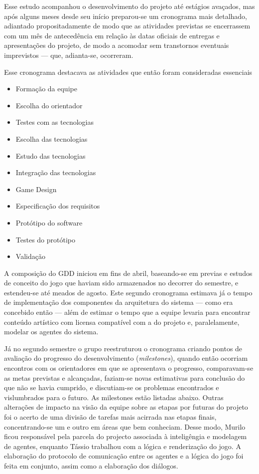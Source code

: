 Esse estudo acompanhou o desenvolvimento do projeto até estágios avaçados, mas após alguns meses desde seu início preparou-se um cronograma mais detalhado, adiantado propositadamente de modo que as atividades previstas se encerrassem com um mês de antecedência em relação às datas oficiais de entregas e apresentações do projeto, de modo a acomodar sem transtornos eventuais imprevistos --- que, adianta-se, ocorreram.

Esse cronograma destacava as atividades que então foram consideradas essenciais
\begin{itemize}
\item Formação da equipe
\item Escolha do orientador
\item Testes com as tecnologias
\item Escolha das tecnologias
\item Estudo das tecnologias
\item Integração das tecnologias
\item Game Design
\item Especificação dos requisitos
\item Protótipo do software
\item Testes do protótipo
\item Validação
\end{itemize}

A composição do GDD iniciou em fins de abril, baseando-se em previas e estudos de conceito do jogo que haviam sido armazenados no decorrer do semestre, e estendeu-se até meados de agosto. Este segundo cronograma estimava já o tempo de implementação dos componentes da arquitetura do sistema --- como era concebido então --- além de estimar o tempo que a equipe levaria para encontrar conteúdo artístico com licensa compatível com a do projeto e, paralelamente, modelar os agentes do sistema.

Já no segundo semestre o grupo reestruturou o cronograma criando pontos de avaliação do progresso do desenvolvimento (\emph{milestones}), quando então ocorriam encontros com os orientadores em que se apresentava o progresso, comparavam-se as metas previstas e alcançadas, faziam-se novas estimativas para conclusão do que não se havia cumprido, e discutiam-se os problemas encontrados e vislumbrados para o futuro. As milestones estão listadas abaixo. Outras alterações de impacto na visão da equipe sobre as etapas por futuras do projeto foi o acerto de uma divisão de tarefas mais acirrada nas etapas finais, concentrando-se um e outro em áreas que bem conheciam. Desse modo, Murilo ficou responsável pela parcela do projecto associada à inteligêngia e modelagem de agentes, enquanto Tássio trabalhou com a lógica e renderização do jogo. A elaboração do protocolo de comunicação entre os agentes e a lógica do jogo foi feita em conjunto, assim como a elaboração dos diálogos. 

